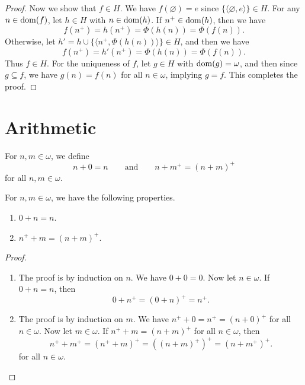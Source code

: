 \begin{proof}
  Now we show that $f \in H$.
  We have $f(\varnothing) = e$ since
  $\{\langle \varnothing, e \rangle\} \in H$.
  For any $n \in \operatorname{dom}(f)$, let $h \in H$ with $n \in \operatorname{dom}(h)$.
  If $n^+ \in \operatorname{dom}(h)$, then we have
  \begin{equation*}
    f(n^+) = h(n^+) = \Phi(h(n)) = \Phi(f(n)).
  \end{equation*}
  Otherwise, let $h' = h \cup \{\langle n^+, \Phi(h(n)) \rangle\} \in H$, and
  then we have
  \begin{equation*}
    f(n^+) = h'(n^+) = \Phi(h(n)) = \Phi(f(n)).
  \end{equation*}
  Thus $f \in H$.
  For the uniqueness of $f$, let $g \in H$ with $\operatorname{dom}(g) = \omega$, and then
  since $g \subseteq f$, we have $g(n) = f(n)$ for all $n \in \omega$, implying
  $g = f$.
  This completes the proof.
\end{proof}

\section{Arithmetic}
\begin{definition}
  For $n, m \in \omega$, we define
  \begin{equation*}
    n + 0 = n
    \qquad \text{and} \qquad
    n + m^+ = (n + m)^+
  \end{equation*}
  for all $n, m \in \omega$.
\end{definition}

\begin{lemma}
  For $n, m \in \omega$, we have the following properties.
  \begin{enumerate}
    \item $0 + n = n$.
    \item $n^+ + m = (n + m)^+$.
  \end{enumerate}
\end{lemma}
\begin{proof}
  \leavevmode
  \begin{enumerate}
    \item The proof is by induction on $n$.
    We have $0 + 0 = 0$.
    Now let $n \in \omega$.
    If $0 + n = n$, then
    \begin{equation*}
      0 + n^+ = (0 + n)^+ = n^+.
    \end{equation*}
    \item The proof is by induction on $m$.
    We have $n^+ + 0 = n^+ = (n + 0)^+$ for all $n \in \omega$.
    Now let $m \in \omega$.
    If $n^+ + m = (n + m)^+$ for all $n \in \omega$, then
    \begin{equation*}
      n^+ + m^+ = (n^+ + m)^+ = ((n + m)^+)^+ = (n + m^+)^+.
    \end{equation*}
    for all $n \in \omega$.
    \qedhere
  \end{enumerate}
\end{proof}

